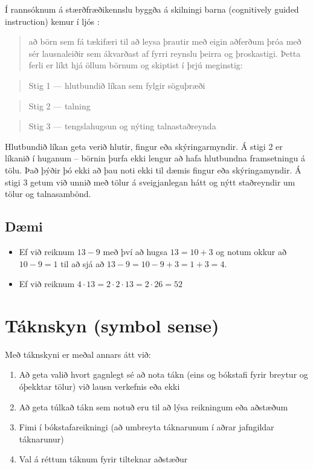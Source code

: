 \documentclass[
  icelandic,
]{book}
\providecommand{\tightlist}{%
  \setlength{\itemsep}{0pt}\setlength{\parskip}{0pt}}
\theoremstyle{definition}
\theoremstyle{definition}
\theoremstyle{definition}
\theoremstyle{definition}
\theoremstyle{remark}
\begin{document}
Í rannsóknum á stærðfræðikennslu byggða á skilningi barna (cognitively guided instruction) kemur í ljós \autocite{kristinsdottir2021}:

\begin{quote}
að börn sem fá tækifæri til að leysa þrautir með eigin aðferðum þróa með sér lausnaleiðir sem ákvarðast af fyrri reynslu þeirra og þroskastigi. Þetta ferli er líkt hjá öllum börnum og skiptist í þrjú meginstig:
\end{quote}

\begin{quote}
Stig 1 --- hlutbundið líkan sem fylgir söguþræði
\end{quote}

\begin{quote}
Stig 2 --- talning
\end{quote}

\begin{quote}
Stig 3 --- tengslahugsun og nýting talnastaðreynda
\end{quote}

Hlutbundið líkan geta verið hlutir, fingur eða skýringarmyndir. Á stigi 2 er líkanið í huganum -- börnin þurfa ekki lengur að hafa hlutbundna framsetningu á tölu. Það þýðir þó ekki að þau noti ekki til dæmis fingur eða skýringamyndir. Á stigi 3 getum við unnið með tölur á sveigjanlegan hátt og nýtt staðreyndir um tölur og talnasambönd.

\subsection{Dæmi}\label{daemi-talnaskyn}

\begin{itemize}
\tightlist
\item
  Ef við reiknum \(13-9\) með því að hugsa \(13 = 10 + 3\) og notum okkur að \(10-9=1\) til að sjá að \(13-9 = 10 - 9 + 3 = 1 + 3 = 4\).
\item
  Ef við reiknum \(4 \cdot 13 = 2 \cdot 2 \cdot 13 = 2 \cdot 26 = 52\)
\end{itemize}

\section{Táknskyn (symbol sense)}\label{taknskyn}

Með táknskyni er meðal annars átt við:

\begin{enumerate}
\def\labelenumi{\alph{enumi}.}
\tightlist
\item
  Að geta valið hvort gagnlegt sé að nota tákn (eins og bókstafi fyrir breytur og óþekktar tölur) við lausn verkefnis eða ekki
\item
  Að geta túlkað tákn sem notuð eru til að lýsa reikningum eða aðstæðum
\item
  Fimi í bókstafareikningi (að umbreyta táknarunum í aðrar jafngildar táknarunur)
\item
  Val á réttum táknum fyrir tilteknar aðstæður
\end{enumerate}
\end{document}
